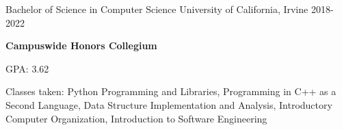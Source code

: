 
\begin{cventries}
  \cventry
    {Bachelor of Science in Computer Science} %
    {University of California, Irvine} %
    {} %
    {2018-2022} %
    {
      \begin {cvitems}
        \item{\textbf{Campuswide Honors Collegium}}
        \item {GPA: 3.62}
        \item{Classes taken: Python Programming and Libraries, Programming in C++ as a Second Language, Data Structure Implementation and Analysis, \newline
        Introductory Computer Organization, Introduction to Software Engineering}
      \end{cvitems}
    }
\end{cventries}
